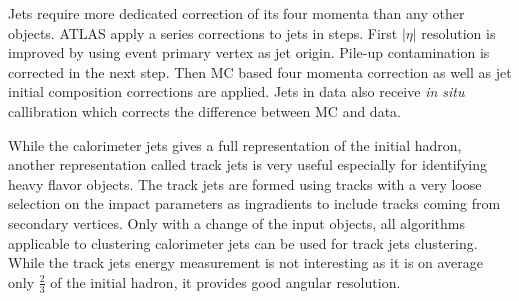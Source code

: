 Jets require more dedicated correction of its four momenta than any other objects. ATLAS apply a series corrections\cite{PERF-2016-04} to jets in steps. First $|\eta|$ resolution is improved by using event primary vertex as jet origin. Pile-up contamination is corrected in the next step. Then MC based four momenta correction as well as jet initial composition corrections are applied. Jets in data also receive \textit{in situ} callibration which corrects the difference between MC and data.

While the calorimeter jets gives a full representation of the initial hadron, another representation called track jets is very useful especially for identifying heavy flavor objects. The track jets are formed using tracks with a very loose selection on the impact parameters as ingradients to include tracks coming from secondary vertices. Only with a change of the input objects, all algorithms applicable to clustering calorimeter jets can be used for track jets clustering. While the track jets energy measurement is not interesting as it is on average only $\frac{2}{3}$ of the initial hadron, it provides good angular resolution. 
